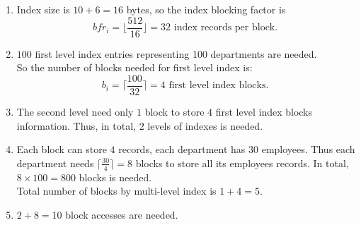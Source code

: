 \begin{homeworkProblem}
\begin{homeworkSubProblem}
    \begin{enumerate}[label=(\roman*)]
        \item Index size is $10+6=16$ bytes, so the index blocking factor is
            \[bfr_i = \bigg\lfloor\frac{512}{16}\bigg\rfloor = 32
            \text{ index records per block. }\]
        \item $100$ first level index entries representing 100 departments
            are needed.\\
            So the number of blocks needed for first level index is:
            \[b_i = \bigg\lceil\frac{100}{32}\bigg\rceil = 4 \text{ first level index blocks. }\]
        \item The second level need only $1$ block to store $4$ first level
            index blocks information. Thus, in total, $2$ levels of indexes
            is needed.
        \item Each block can store $4$ records, each department has $30$ employees.
            Thus each department needs $\displaystyle\bigg\lceil\frac{30}{4}\bigg\rceil = 8$
            blocks to store all its employees records. In total,
            $8 \times 100 = 800$ blocks is needed. \\
            Total number of blocks by multi-level index is $1 + 4 = 5$.
        \item $2 + 8 = 10$ block accesses are needed.
    \end{enumerate}
\end{homeworkSubProblem}


\end{homeworkProblem}
